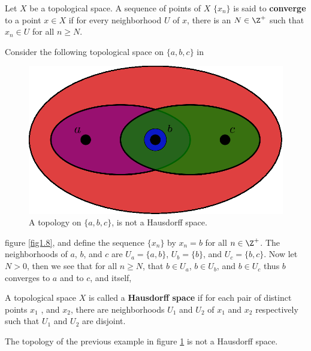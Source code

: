 \begin{definition}
    Let $X$ be a topological space. A sequence of points of $X$ $\{x_n\}$ is
    said to \textbf{converge} to a point  $x \in X$ if for every neighborhood
    $U$ of $x$, there is an  $N \in \Z^+$ such that  $x_n \in U$ for all
    $n \geq N$.
\end{definition}

\begin{example}
    Consider the following topological space on $\{a,b,c\}$ in
    \begin{figure}[h]
        \centering
        \includegraphics[scale = 0.5]{Figures/Chapter1/non_hausdorff_space.eps}
        \caption{A topology on $\{a,b,c\}$, is not a Hausdorff space.}
        \label{fig_1.8}
    \end{figure}
    figure \ref{fig1.8}, and define the sequence $\{x_n\}$ by  $x_n=b$ for all
    $n \in \Z^+$. The neighborhoods of  $a$, $b$, and $c$ are
    $U_a=\{a,b\}$,  $U_b=\{b\}$, and  $U_c=\{b,c\}$. Now let $N>0$, then we see
    that for all  $n \geq N$, that  $b \in U_a$, $b \in U_b$, and $b \in U_c$
    thus  $b$ converges to  $a$ and to  $c$, and itself,
\end{example}

\begin{definition}
    A topological space $X$ is called a \textbf{Hausdorff space} if for each
    pair of distinct points  $ x_1$ , and $x_2$, there are neighborhoods $ U_1$
    and $U_2$ of $ x_1$ and $ x_2$ respectively such that $ U_1$ and $U_2$ are
    disjoint.
\end{definition}

\begin{example}
    The topology of the previous example in figure \ref{fig_1.8} is not a
    Hausdorff space.
\end{example}


